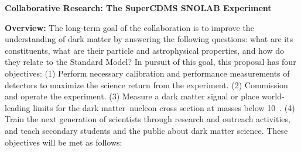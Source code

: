 

\begin{center}
{\large{\bf Collaborative Research: The SuperCDMS SNOLAB Experiment}}
\end{center}

{\bf Overview:} The long-term goal of the \scs collaboration is to improve the understanding of dark matter by answering the following questions: what are its constituents, what are their particle and astrophysical properties, and how do they relate to the Standard Model? In pursuit of this goal, this proposal has four objectives:  
(1) Perform necessary calibration and performance measurements of \scs detectors to maximize the science return from the experiment.
(2) Commission and operate the \scs experiment.
(3) Measure a dark matter signal or place world-leading limits for the dark matter--nucleon cross section at masses below 10~\gev.
(4) Train the next generation of scientists through research and outreach activities, and teach secondary students and the public about dark matter science. 
These objectives will be met as follows:

 


